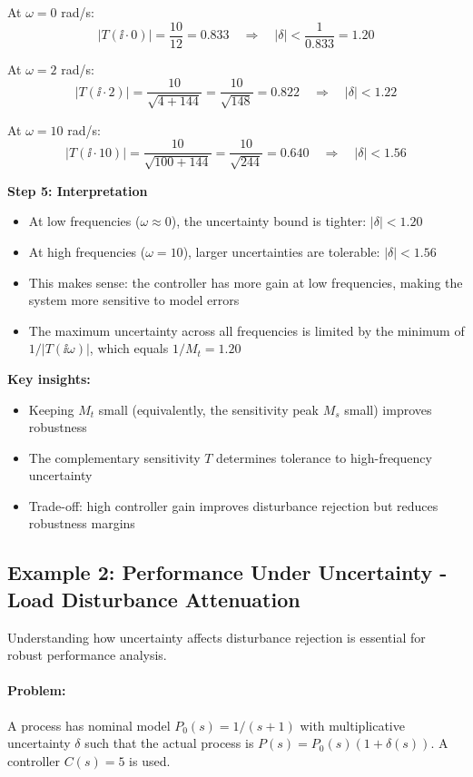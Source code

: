 \documentclass[11pt,a4paper]{article}
\begin{document}
At $\omega = 0$ rad/s:
\[
|T(\ii \cdot 0)| = \frac{10}{12} = 0.833 \quad \Rightarrow \quad |\delta| < \frac{1}{0.833} = 1.20
\]

At $\omega = 2$ rad/s:
\[
|T(\ii \cdot 2)| = \frac{10}{\sqrt{4 + 144}} = \frac{10}{\sqrt{148}} = 0.822 \quad \Rightarrow \quad |\delta| < 1.22
\]

At $\omega = 10$ rad/s:
\[
|T(\ii \cdot 10)| = \frac{10}{\sqrt{100 + 144}} = \frac{10}{\sqrt{244}} = 0.640 \quad \Rightarrow \quad |\delta| < 1.56
\]

\textbf{Step 5: Interpretation}

\begin{itemize}
\item At low frequencies ($\omega \approx 0$), the uncertainty bound is tighter: $|\delta| < 1.20$
\item At high frequencies ($\omega = 10$), larger uncertainties are tolerable: $|\delta| < 1.56$
\item This makes sense: the controller has more gain at low frequencies, making the system more sensitive to model errors
\item The maximum uncertainty across all frequencies is limited by the minimum of $1/|T(\ii\omega)|$, which equals $1/M_t = 1.20$
\end{itemize}

\textbf{Key insights:}
\begin{itemize}
\item Keeping $M_t$ small (equivalently, the sensitivity peak $M_s$ small) improves robustness
\item The complementary sensitivity $T$ determines tolerance to high-frequency uncertainty
\item Trade-off: high controller gain improves disturbance rejection but reduces robustness margins
\end{itemize}

\subsection{Example 2: Performance Under Uncertainty - Load Disturbance Attenuation}

Understanding how uncertainty affects disturbance rejection is essential for robust performance analysis.

\paragraph{Problem:}
A process has nominal model $P_0(s) = 1/(s+1)$ with multiplicative uncertainty $\delta$ such that the actual process is $P(s) = P_0(s)(1+\delta(s))$. A controller $C(s) = 5$ is used.
\end{document}

